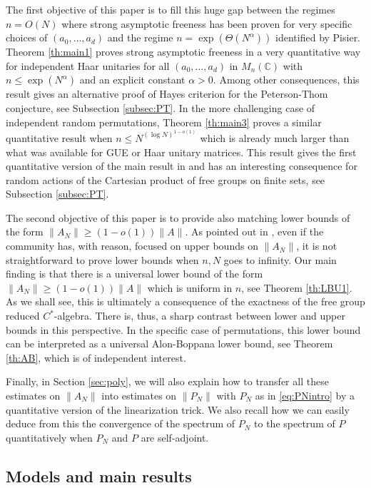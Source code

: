 \documentclass[11pt]{article}
\newcommand{\dC}{\mathbb {C}}
\newcommand{\1}{1\!\!{\sf I}}
\begin{document}
The first objective of this paper is to fill this huge gap between the regimes $n = O(N)$ where strong asymptotic freeness has been proven for very specific choices of $(a_0,\ldots, a_d)$ and the regime $n = \exp ( \Theta(N^\alpha))$ identified by Pisier.  Theorem \ref{th:main1} proves strong asymptotic freeness in a very quantitative way for independent Haar unitaries for all $(a_0,\ldots,a_d)$ in $M_n (\dC)$ with $n \leq \exp ( N^{\alpha})$ and an explicit constant $\alpha >0$. Among other consequences, this result gives an alternative proof of Hayes criterion  \cite{MR4448584} for the Peterson-Thom conjecture, see Subsection \ref{subsec:PT}. In the more challenging case of independent random permutations, Theorem \ref{th:main3} proves a similar quantitative result when $n \leq N^{(\log N)^{1-o(1)}}$ which is already much larger than what was available for GUE or Haar unitary matrices.  This result gives the first quantitative version of the main result in \cite{MR4024563} and has an interesting consequence for random actions of the Cartesian product of free groups on finite sets, see Subsection \ref{subsec:PT}. 


The second objective  of this paper is to provide also matching lower bounds of the form $\| A_N \| \geq (1-o(1)) \| A \|$. As pointed out in \cite{bandeira2023matrix}, even if the community has, with reason, focused on upper bounds on $\|A_N\|$, it is not straightforward to prove lower bounds when $n,N$ goes to infinity.  Our main finding is that there is a universal lower bound of the form $\| A_N \| \geq (1-o(1)) \| A \|$ which is uniform in $n$, see Theorem \ref{th:LBU1}. As we shall see, this is ultimately a consequence of the exactness of the free group reduced $C^*$-algebra. There is, thus, a sharp contrast between lower and upper bounds in this perspective. In the specific case of permutations, this lower bound can be interpreted as a universal Alon-Boppana lower bound, see Theorem \ref{th:AB}, which is of independent interest. 


Finally, in Section \ref{sec:poly}, we will also explain how to transfer all these estimates on $\|A_N\|$ into estimates on $\|P_N\|$ with $P_N$ as in \eqref{eq:PNintro} by a quantitative version of the linearization trick. We also recall how we can easily deduce from this the convergence of the spectrum of $P_N$ to the spectrum of $P$ quantitatively when $P_N$ and $P$ are self-adjoint. 

\subsection{Models and main results}
\end{document}
